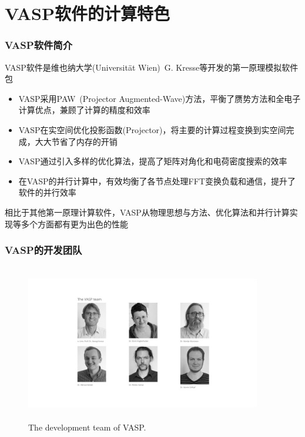 \section{\rm{VASP}软件的计算特色}
\frame
{
	\frametitle{\textrm{VASP}软件简介}
	\textrm{VASP}软件是维也纳大学\textrm{(Universit\"at Wien)}~\textrm{G. Kresse}等开发的第一原理模拟软件包
	\begin{itemize}
		\item \textrm{VASP}采用\textrm{PAW~(Projector Augmented-Wave)}方法，平衡了赝势方法和全电子计算优点，兼顾了计算的精度和效率
		\item \textrm{VASP}在实空间优化投影函数\textrm{(Projector)}，将主要的计算过程变换到实空间完成，大大节省了内存的开销%
		\item \textrm{VASP}通过引入多样的优化算法，提高了矩阵对角化和电荷密度搜索的效率%
		\item 在\textrm{VASP}的并行计算中，有效均衡了各节点处理\textrm{FFT}变换负载和通信，提升了软件的并行效率
	\end{itemize}
	相比于其他第一原理计算软件，\textrm{VASP}从物理思想与方法、优化算法和并行计算实现等多个方面都有更为出色的性能%
}

\frame
{
	\frametitle{\textrm{VASP}的开发团队}
\begin{figure}[h!]
\centering
\vspace*{-0.25in}
\includegraphics[height=2.70in,width=4.05in,viewport=330 130 1280 770,clip]{Figures/VASP_team.png}
\caption{\tiny \textrm{The development team of VASP.}}%
\label{VASP_team}
\end{figure}
}

